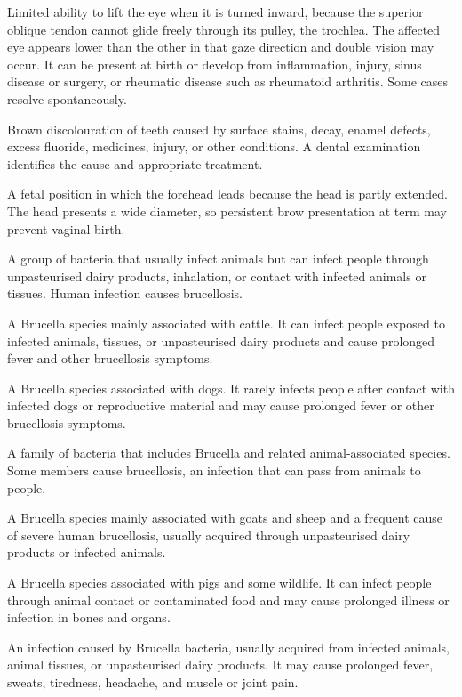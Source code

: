  Limited ability to lift the eye when it is turned inward, because the superior oblique tendon cannot glide freely through its pulley, the trochlea. The affected eye appears lower than the other in that gaze direction and double vision may occur. It can be present at birth or develop from inflammation, injury, sinus disease or surgery, or rheumatic disease such as rheumatoid arthritis. Some cases resolve spontaneously.

 Brown discolouration of teeth caused by surface stains, decay, enamel defects, excess fluoride, medicines, injury, or other conditions. A dental examination identifies the cause and appropriate treatment.

 A fetal position in which the forehead leads because the head is partly extended. The head presents a wide diameter, so persistent brow presentation at term may prevent vaginal birth.

 A group of bacteria that usually infect animals but can infect people through unpasteurised dairy products, inhalation, or contact with infected animals or tissues. Human infection causes brucellosis.

 A Brucella species mainly associated with cattle. It can infect people exposed to infected animals, tissues, or unpasteurised dairy products and cause prolonged fever and other brucellosis symptoms.

 A Brucella species associated with dogs. It rarely infects people after contact with infected dogs or reproductive material and may cause prolonged fever or other brucellosis symptoms.

 A family of bacteria that includes Brucella and related animal-associated species. Some members cause brucellosis, an infection that can pass from animals to people.

 A Brucella species mainly associated with goats and sheep and a frequent cause of severe human brucellosis, usually acquired through unpasteurised dairy products or infected animals.

 A Brucella species associated with pigs and some wildlife. It can infect people through animal contact or contaminated food and may cause prolonged illness or infection in bones and organs.

 An infection caused by Brucella bacteria, usually acquired from infected animals, animal tissues, or unpasteurised dairy products. It may cause prolonged fever, sweats, tiredness, headache, and muscle or joint pain.

